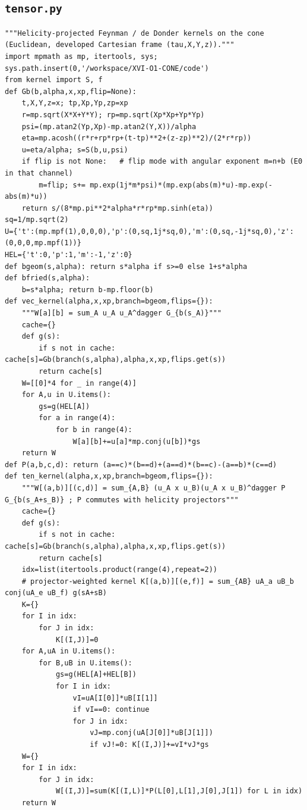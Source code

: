 \documentclass[10pt]{article}
\begin{document}
\subsection{\texttt{tensor.py}}
\begin{lstlisting}
"""Helicity-projected Feynman / de Donder kernels on the cone (Euclidean, developed Cartesian frame (tau,X,Y,z))."""
import mpmath as mp, itertools, sys; sys.path.insert(0,'/workspace/XVI-O1-CONE/code')
from kernel import S, f
def Gb(b,alpha,x,xp,flip=None):
    t,X,Y,z=x; tp,Xp,Yp,zp=xp
    r=mp.sqrt(X*X+Y*Y); rp=mp.sqrt(Xp*Xp+Yp*Yp)
    psi=(mp.atan2(Yp,Xp)-mp.atan2(Y,X))/alpha
    eta=mp.acosh((r*r+rp*rp+(t-tp)**2+(z-zp)**2)/(2*r*rp))
    u=eta/alpha; s=S(b,u,psi)
    if flip is not None:   # flip mode with angular exponent m=n+b (E0 in that channel)
        m=flip; s+= mp.exp(1j*m*psi)*(mp.exp(abs(m)*u)-mp.exp(-abs(m)*u))
    return s/(8*mp.pi**2*alpha*r*rp*mp.sinh(eta))
sq=1/mp.sqrt(2)
U={'t':(mp.mpf(1),0,0,0),'p':(0,sq,1j*sq,0),'m':(0,sq,-1j*sq,0),'z':(0,0,0,mp.mpf(1))}
HEL={'t':0,'p':1,'m':-1,'z':0}
def bgeom(s,alpha): return s*alpha if s>=0 else 1+s*alpha
def bfried(s,alpha):
    b=s*alpha; return b-mp.floor(b)
def vec_kernel(alpha,x,xp,branch=bgeom,flips={}):
    """W[a][b] = sum_A u_A u_A^dagger G_{b(s_A)}"""
    cache={}
    def g(s):
        if s not in cache: cache[s]=Gb(branch(s,alpha),alpha,x,xp,flips.get(s))
        return cache[s]
    W=[[0]*4 for _ in range(4)]
    for A,u in U.items():
        gs=g(HEL[A])
        for a in range(4):
            for b in range(4):
                W[a][b]+=u[a]*mp.conj(u[b])*gs
    return W
def P(a,b,c,d): return (a==c)*(b==d)+(a==d)*(b==c)-(a==b)*(c==d)
def ten_kernel(alpha,x,xp,branch=bgeom,flips={}):
    """W[(a,b)][(c,d)] = sum_{A,B} (u_A x u_B)(u_A x u_B)^dagger P G_{b(s_A+s_B)} ; P commutes with helicity projectors"""
    cache={}
    def g(s):
        if s not in cache: cache[s]=Gb(branch(s,alpha),alpha,x,xp,flips.get(s))
        return cache[s]
    idx=list(itertools.product(range(4),repeat=2))
    # projector-weighted kernel K[(a,b)][(e,f)] = sum_{AB} uA_a uB_b conj(uA_e uB_f) g(sA+sB)
    K={}
    for I in idx:
        for J in idx:
            K[(I,J)]=0
    for A,uA in U.items():
        for B,uB in U.items():
            gs=g(HEL[A]+HEL[B])
            for I in idx:
                vI=uA[I[0]]*uB[I[1]]
                if vI==0: continue
                for J in idx:
                    vJ=mp.conj(uA[J[0]]*uB[J[1]])
                    if vJ!=0: K[(I,J)]+=vI*vJ*gs
    W={}
    for I in idx:
        for J in idx:
            W[(I,J)]=sum(K[(I,L)]*P(L[0],L[1],J[0],J[1]) for L in idx)
    return W
\end{lstlisting}
\end{document}
